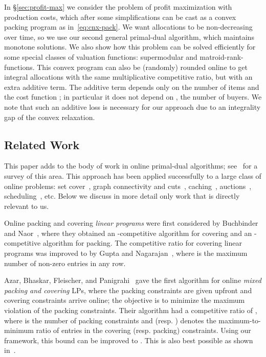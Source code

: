 \documentclass[letterpaper,11pt]{article}
\begin{document}
In \S\ref{sec:profit-max} we consider the problem of profit maximization
with production costs, which after some simplifications can be cast as a
convex packing program as in~\eqref{eq:cnx-pack}.  We want allocations
to be non-decreasing over time, so we use our second general primal-dual
algorithm, which maintains monotone solutions. We also show how this
problem can be solved efficiently for some special classes of valuation
functions: supermodular and matroid-rank-functions. This convex program
can also be (randomly) rounded online to get integral allocations with the
same multiplicative competitive ratio, but with an extra additive term. The
additive term depends only on the number  of items and the cost
function ; in particular it does not depend on , the number of
buyers. We note that such an additive loss is necessary for our approach
due to an integrality gap of the convex relaxation.

\subsection{Related Work}
\label{sec:related-work}

This paper adds to the body of work in online primal-dual algorithms;
see~\cite{BN-mono} for a survey of this area. This approach has been
applied successfully to a large class of online problems: set
cover~\cite{AAABN03}, graph connectivity and cuts~\cite{AAABN-talg06},
caching~\cite{BBN-focs07-paging}, auctions~\cite{HK15}, scheduling~\cite{DH14},
etc. Below we discuss in more detail only work that is directly
relevant to us.

Online packing and covering {\em linear programs} were first considered by
Buchbinder and Naor~\cite{BN-MOR}, where they obtained an -competitive algorithm for covering and an -competitive algorithm for packing. The competitive ratio for covering linear
programs was improved to  by Gupta and
Nagarajan~\cite{GN12-mor}, where  is the maximum number of
non-zero entries in any row.

Azar, Bhaskar, Fleischer, and Panigrahi~\cite{ABFP13} gave the first
algorithm for online {\em mixed packing and covering} LPs, where the
packing constraints are given upfront and covering constraints arrive
online; the objective is to minimize the maximum violation of the
packing constraints. Their algorithm had a competitive ratio of , where  is the number of packing
constraints and  (resp. ) denotes the maximum-to-minimum
ratio of entries in the covering (resp. packing) constraints. Using our
framework, this bound can be improved to . This
is also best possible as shown in~\cite{ABFP13}.
\end{document}
